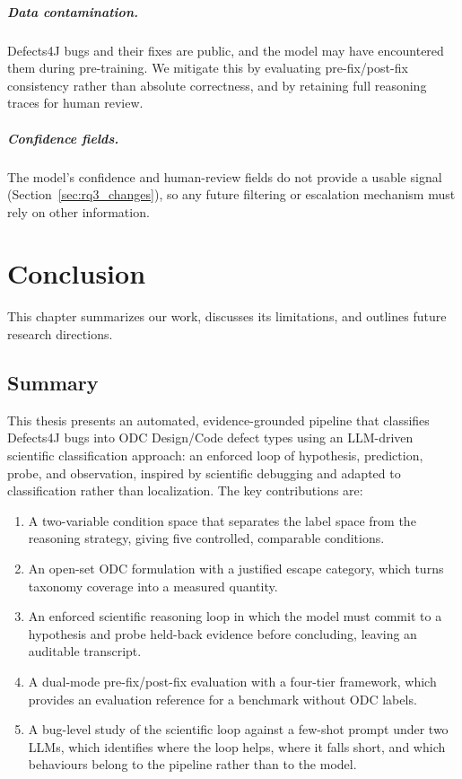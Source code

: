 \documentclass{iutbscthesis}
\begin{document}
\paragraph{Data contamination.} Defects4J bugs and their fixes are public, and the model may have encountered them during pre-training. We mitigate this by evaluating pre-fix/post-fix consistency rather than absolute correctness, and by retaining full reasoning traces for human review.

\paragraph{Confidence fields.} The model's confidence and human-review fields do not provide a usable signal (Section~\ref{sec:rq3_changes}), so any future filtering or escalation mechanism must rely on other information.


\chapter{Conclusion} \label{chapter:conclusion}

This chapter summarizes our work, discusses its limitations, and outlines future research directions.

\section{Summary}

This thesis presents an automated, evidence-grounded pipeline that classifies Defects4J bugs into ODC Design/Code defect types using an LLM-driven scientific classification approach: an enforced loop of hypothesis, prediction, probe, and observation, inspired by scientific debugging and adapted to classification rather than localization. The key contributions are:

\begin{enumerate}
    \item A two-variable condition space that separates the label space from the reasoning strategy, giving five controlled, comparable conditions.
    \item An open-set ODC formulation with a justified escape category, which turns taxonomy coverage into a measured quantity.
    \item An enforced scientific reasoning loop in which the model must commit to a hypothesis and probe held-back evidence before concluding, leaving an auditable transcript.
    \item A dual-mode pre-fix/post-fix evaluation with a four-tier framework, which provides an evaluation reference for a benchmark without ODC labels.
    \item A bug-level study of the scientific loop against a few-shot prompt under two LLMs, which identifies where the loop helps, where it falls short, and which behaviours belong to the pipeline rather than to the model.
\end{enumerate}
\end{document}
